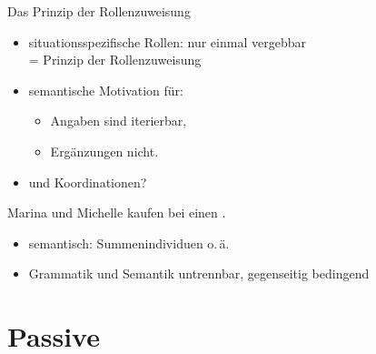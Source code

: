 \begin{frame}
  {Das Prinzip der Rollenzuweisung}
  \pause
  \begin{itemize}[<+->]
    \item situationsspezifische Rollen: \alert{nur einmal vergebbar}\\
    = Prinzip der Rollenzuweisung
      \Halbzeile
    \item semantische Motivation für:
      \begin{itemize}[<+->]
        \item Angaben sind iterierbar,
        \item Ergänzungen nicht.
      \end{itemize}
      \Halbzeile
    \item und \alert{Koordinationen}?
  \end{itemize}
  \pause
  \begin{exe}
    \ex \alert{Marina und Michelle} kaufen bei  einen .
  \end{exe}
  \pause
  \begin{itemize}[<+->]
    \item semantisch: Summenindividuen o.\,ä.
    \item \alert{Grammatik und Semantik untrennbar, gegenseitig bedingend}
  \end{itemize}
\end{frame}

\section{Passive}

